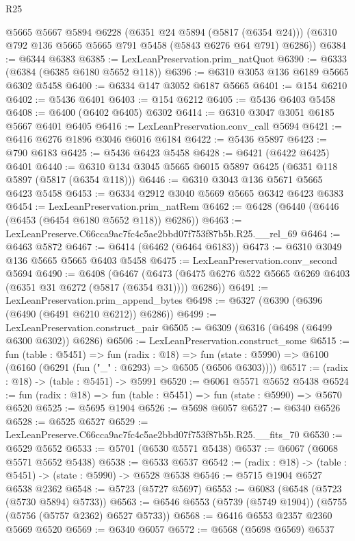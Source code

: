 \begin{lexlean}{R25}
\begin{coremodule}
      @5665
      @5667
      @5894
      @6228
      (@6351 @24 @5894 (@5817 (@6354 @24)))
      (@6310 @792 @136 @5665 @5665 @791 @5458 (@5843 @6276 @64 @791) @6286))
@6384 := @6344 @6383
@6385 := LexLeanPreservation.prim_natQuot
@6390 := @6333 (@6384 (@6385 @6180 @5652 @118))
@6396 := @6310 @3053 @136 @6189 @5665 @6302 @5458
@6400 := @6334 @147 @3052 @6187 @5665
@6401 := @154 @6210
@6402 := @5436 @6401
@6403 := @154 @6212
@6405 := @5436 @6403 @5458
@6408 := @6400 (@6402 @6405) @6302
@6414 := @6310 @3047 @3051 @6185 @5667 @6401 @6405
@6416 := LexLeanPreservation.conv_call @5694
@6421 := @6416 @6276 @1896 @3046 @6016 @6184
@6422 := @5436 @5897
@6423 := @790 @6183
@6425 := @5436 @6423 @5458
@6428 := @6421 (@6422 @6425) @6401
@6440 := @6310 @134 @3045 @5665 @6015 @5897 @6425 (@6351 @118 @5897 (@5817 (@6354 @118)))
@6446 := @6310 @3043 @136 @5671 @5665 @6423 @5458
@6453 := @6334 @2912 @3040 @5669 @5665 @6342 @6423 @6383
@6454 := LexLeanPreservation.prim_natRem
@6462 := @6428 (@6440 (@6446 (@6453 (@6454 @6180 @5652 @118)) @6286))
@6463 := LexLeanPreserve.C66cca9ac7fc4c5ae2bbd07f753f87b5b.R25.__rel_69
@6464 := @6463 @5872
@6467 := @6414 (@6462 (@6464 @6183))
@6473 := @6310 @3049 @136 @5665 @5665 @6403 @5458
@6475 := LexLeanPreservation.conv_second @5694
@6490 := @6408
    (@6467 (@6473 (@6475 @6276 @522 @5665 @6269 @6403 (@6351 @31 @6272 (@5817 (@6354 @31)))) @6286))
@6491 := LexLeanPreservation.prim_append_bytes
@6498 := @6327 (@6390 (@6396 (@6490 (@6491 @6210 @6212)) @6286))
@6499 := LexLeanPreservation.construct_pair
@6505 := @6309 (@6316 (@6498 (@6499 @6300 @6302)) @6286)
@6506 := LexLeanPreservation.construct_some
@6515 := fun (table : @5451) =>
  fun (radix : @18) =>
  fun (state : @5990) => @6100 (@6160 (@6291 (fun ("_" : @6293) => @6505 (@6506 @6303))))
@6517 := (radix : @18) -> (table : @5451) -> @5991
@6520 := @6061 @5571 @5652 @5438
@6524 := fun (radix : @18) => fun (table : @5451) => fun (state : @5990) => @5670 @6520
@6525 := @5695 @1904
@6526 := @5698 @6057
@6527 := @6340 @6526
@6528 := @6525 @6527
@6529 := LexLeanPreserve.C66cca9ac7fc4c5ae2bbd07f753f87b5b.R25.__fits_70
@6530 := @6529 @5652
@6533 := @5701 (@6530 @5571 @5438)
@6537 := @6067 (@6068 @5571 @5652 @5438)
@6538 := @6533 @6537
@6542 := (radix : @18) -> (table : @5451) -> (state : @5990) -> @6528 @6538
@6546 := @5715 @1904 @6527 @6538 @2362
@6548 := @5723 (@5727 @5697)
@6553 := @6083 (@6548 (@5723 (@5730 @5894) @5733))
@6563 := @6546 @6553 (@5739 (@5749 @1904)) (@5755 (@5756 (@5757 @2362) @6527 @5733))
@6568 := @6416 @6553 @2357 @2360 @5669 @6520
@6569 := @6340 @6057
@6572 := @6568 (@5698 @6569) @6537

\end{coremodule}
\end{lexlean}
